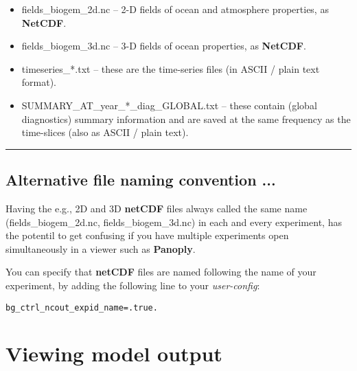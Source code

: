 \vspace{1mm}
\begin{itemize}[noitemsep]
\setlength{\itemindent}{.2in}
\item \textsf{\footnotesize fields\_biogem\_2d.nc} – 2-D fields of ocean and atmosphere properties, as \textbf{NetCDF}.
\item \textsf{\footnotesize fields\_biogem\_3d.nc} – 3-D fields of ocean properties, as \textbf{NetCDF}.
\item \textsf{\footnotesize timeseries\_*.txt} – these are the time-series files (in ASCII / plain text format).
\item \textsf{\footnotesize SUMMARY\_AT\_year\_*\_diag\_GLOBAL.txt} – these contain (global diagnostics) summary information and are saved at the same frequency as the time-slices (also as ASCII / plain text).
\end{itemize}
\vspace{1mm}

\vspace{1mm}
\noindent\rule{4cm}{0.1mm}

\subsection*{Alternative file naming convention ...}

Having the e.g., 2D and 3D \textbf{netCDF} files always called the same name (\textsf{\footnotesize fields\_biogem\_2d.nc}, \textsf{\footnotesize fields\_biogem\_3d.nc}) in each and every experiment, has the potentil to get confusing if you have multiple experiments open simultaneously in a viewer such as \textbf{Panoply}.

You can specify that \textbf{netCDF} files are named following the name of your experiment, by adding the following line to your \textit{user-config}:

\vspace{-1mm}\begin{verbatim}
bg_ctrl_ncout_expid_name=.true.
\end{verbatim}

\newpage

\section{Viewing model output}

